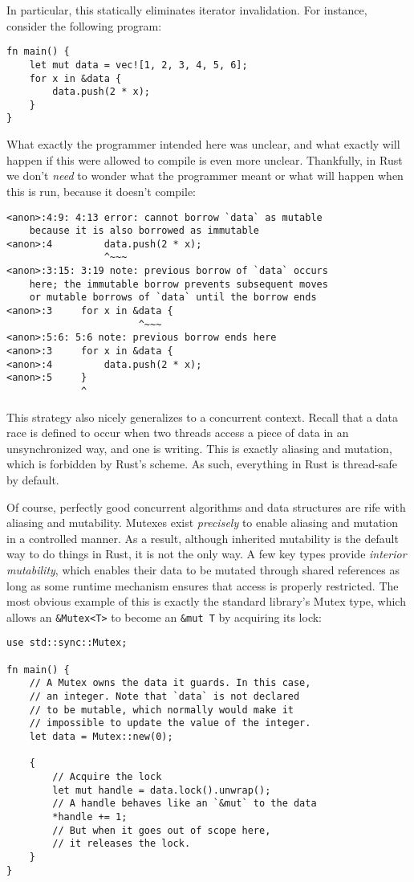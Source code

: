 In particular, this statically eliminates iterator invalidation. For
instance, consider the following program:

\begin{verbatim}
fn main() {
    let mut data = vec![1, 2, 3, 4, 5, 6];
    for x in &data {
        data.push(2 * x);
    }
}
\end{verbatim}

What exactly the programmer intended here was unclear, and what exactly
will happen if this were allowed to compile is even more unclear.
Thankfully, in Rust we don't \emph{need} to wonder what the programmer meant or
what will happen when this is run, because it doesn't compile:

\begin{verbatim}
<anon>:4:9: 4:13 error: cannot borrow `data` as mutable
    because it is also borrowed as immutable
<anon>:4         data.push(2 * x);
                 ^~~~
<anon>:3:15: 3:19 note: previous borrow of `data` occurs
    here; the immutable borrow prevents subsequent moves
    or mutable borrows of `data` until the borrow ends
<anon>:3     for x in &data {
                       ^~~~
<anon>:5:6: 5:6 note: previous borrow ends here
<anon>:3     for x in &data {
<anon>:4         data.push(2 * x);
<anon>:5     }
             ^
\end{verbatim}

This strategy also nicely generalizes to a concurrent context. Recall that a data race is
defined to occur when two threads access a piece of data in an unsynchronized
way, and one is writing. This is exactly aliasing and mutation, which is
forbidden by Rust's scheme. As such, everything in Rust is thread-safe by default.

Of course, perfectly good concurrent algorithms and data structures are rife with aliasing and
mutability. Mutexes exist \emph{precisely} to enable aliasing and mutation in a
controlled manner. As a result, although inherited mutability is the default way to do things in
Rust, it is not the only way. A few key types provide \emph{interior mutability},
which enables their data to be mutated through shared references as long as some
runtime mechanism ensures that access is properly restricted. The most
obvious example of this is exactly the standard library's Mutex type, which
allows an \texttt{&Mutex<T>} to become an \texttt{&mut T} by
acquiring its lock:

\begin{verbatim}
use std::sync::Mutex;

fn main() {
    // A Mutex owns the data it guards. In this case,
    // an integer. Note that `data` is not declared
    // to be mutable, which normally would make it
    // impossible to update the value of the integer.
    let data = Mutex::new(0);

    {
        // Acquire the lock
        let mut handle = data.lock().unwrap();
        // A handle behaves like an `&mut` to the data
        *handle += 1;
        // But when it goes out of scope here,
        // it releases the lock.
    }
}
\end{verbatim}

